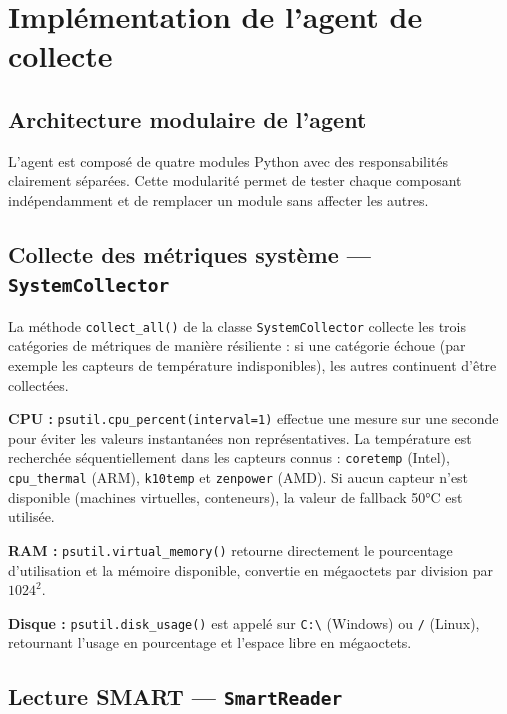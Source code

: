 \section{Implémentation de l'agent de collecte}

\subsection{Architecture modulaire de l'agent}

L'agent est composé de quatre modules Python avec des responsabilités clairement séparées.
Cette modularité permet de tester chaque composant indépendamment et de remplacer un
module sans affecter les autres.

\subsection{Collecte des métriques système — \texttt{SystemCollector}}

La méthode \texttt{collect\_all()} de la classe \texttt{SystemCollector} collecte les
trois catégories de métriques de manière résiliente : si une catégorie échoue (par exemple
les capteurs de température indisponibles), les autres continuent d'être collectées.

\textbf{CPU :} \texttt{psutil.cpu\_percent(interval=1)} effectue une mesure sur une
seconde pour éviter les valeurs instantanées non représentatives. La température est
recherchée séquentiellement dans les capteurs connus : \texttt{coretemp} (Intel),
\texttt{cpu\_thermal} (ARM), \texttt{k10temp} et \texttt{zenpower} (AMD). Si aucun
capteur n'est disponible (machines virtuelles, conteneurs), la valeur de fallback 50°C
est utilisée.

\textbf{RAM :} \texttt{psutil.virtual\_memory()} retourne directement le pourcentage
d'utilisation et la mémoire disponible, convertie en mégaoctets par division par
$1024^2$.

\textbf{Disque :} \texttt{psutil.disk\_usage()} est appelé sur \texttt{C:\textbackslash}
(Windows) ou \texttt{/} (Linux), retournant l'usage en pourcentage et l'espace libre
en mégaoctets.

\subsection{Lecture SMART — \texttt{SmartReader}}

